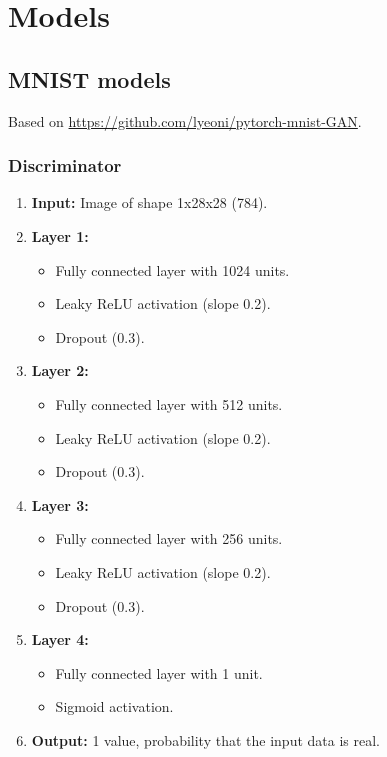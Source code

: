 \chapter{Models} \label{appendix:models}
\section{MNIST models}
Based on \url{https://github.com/lyeoni/pytorch-mnist-GAN}.
\subsection*{Discriminator}
\begin{enumerate}
    \item \textbf{Input:} Image of shape 1x28x28 (784).
    \item \textbf{Layer 1:} 
    \begin{itemize}
        \item Fully connected layer with 1024 units.
        \item Leaky ReLU activation (slope 0.2).
        \item Dropout (0.3).
    \end{itemize}
    \item \textbf{Layer 2:} 
    \begin{itemize}
        \item Fully connected layer with 512 units.
        \item Leaky ReLU activation (slope 0.2).
        \item Dropout (0.3).
    \end{itemize}
    \item \textbf{Layer 3:} 
    \begin{itemize}
        \item Fully connected layer with 256 units.
        \item Leaky ReLU activation (slope 0.2).
        \item Dropout (0.3).
    \end{itemize}
    \item \textbf{Layer 4:} 
    \begin{itemize}
        \item Fully connected layer with 1 unit.
        \item Sigmoid activation.
    \end{itemize}
    \item \textbf{Output:} 1 value, probability that the input data is real.
\end{enumerate}

